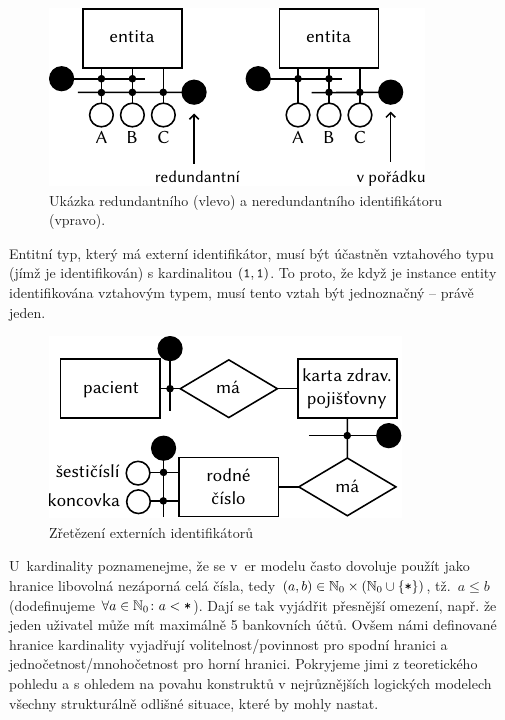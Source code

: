 \begin{figure}[!htb]
  \centering
  \includegraphics[width=\maxwidth{\textwidth}]{../img/er-model/redundant-ids.pdf}
  \caption[Ukázka redundantního a neredundantního identifikátoru]{Ukázka redundantního (vlevo) a neredundantního identifikátoru (vpravo).}
  \label{fig:redundant-ids}
\end{figure}

Entitní typ, který má externí identifikátor, musí být účastněn vztahového typu (jímž je identifikován) s kardinalitou $(\texttt{1},\texttt{1})$.
To proto, že když je instance entity identifikována vztahovým typem, musí tento vztah být jednoznačný -- právě jeden.

\begin{figure}[!htb]
  \centering
  \includegraphics[width=\maxwidth{\textwidth}]{../img/er-model/external-id-chain.pdf}
  \caption{Zřetězení externích identifikátorů}
  \label{fig:er-external-identifier-chain}
\end{figure}

U~kardinality poznamenejme, že se v~\acrshort{er} modelu často dovoluje použít jako hranice libovolná nezáporná celá čísla, tedy $(a, b)\in \mathbb N_0\times \left(\mathbb N_0 \cup \left\{\texttt{*}\right\}\right)$, tž.~$a\leq b$ (dodefinujeme $\forall a\in\mathbb N_0\colon a < \texttt{*}$).
Dají se tak vyjádřit přesnější omezení, např. že jeden uživatel může mít maximálně 5 bankovních účtů.
Ovšem námi definované hranice kardinality vyjadřují volitelnost/povinnost pro spodní hranici a jednočetnost/mnohočetnost pro horní hranici.
Pokryjeme jimi z teoretického pohledu a s ohledem na povahu konstruktů v nejrůznějších logických modelech všechny strukturálně odlišné situace, které by mohly nastat.

